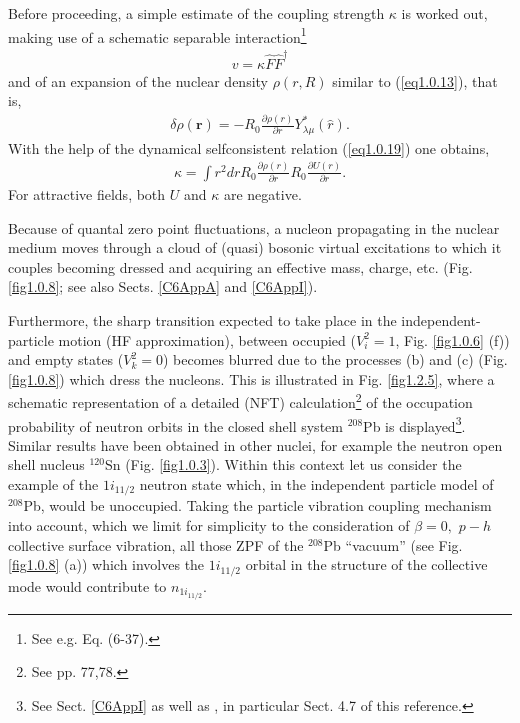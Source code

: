 Before proceeding, a simple estimate of the coupling strength $\kappa$ is worked out, making use of a schematic separable interaction\footnote{See e.g. \cite{Bohr:75} Eq. (6-37).}
\begin{align}\label{eq1.2.9}
v=\kappa\hat F\hat F^\dagger
\end{align}
and of an expansion of the nuclear density $\rho(r,R)$ similar to (\ref{eq1.0.13}), that is,
\begin{align}\label{eq1.2.10}
\delta\rho(\mathbf r)=-R_0\frac{\partial\rho(r)}{\partial r} Y^*_{\lambda\mu}(\hat r).
\end{align}
With the help of the dynamical selfconsistent relation  (\ref{eq1.0.19}) one obtains,
\begin{align}\label{eq1.2.11}
\kappa=\int r^2 dr R_0\frac{\partial\rho(r)}{\partial r}R_0\frac{\partial U(r)}{\partial r}.
\end{align}
For attractive fields, both $U$ and $\kappa$ are negative.



Because of quantal zero point fluctuations, a nucleon propagating in the nuclear medium moves through a cloud of (quasi) bosonic  virtual excitations to which it couples becoming dressed and acquiring  an effective mass, charge, etc. (Fig. \ref{fig1.0.8}; see also Sects. \ref{C6AppA} and \ref{C6AppI}). 




Furthermore, the sharp transition expected to take place in the independent-particle motion (HF approximation), between occupied ($V^2_i=1$, Fig. \ref{fig1.0.6} (f)) and empty states ($V^2_k=0$) becomes blurred due to the processes (b) and (c) (Fig. \ref{fig1.0.8}) which dress the nucleons. This is illustrated in Fig. \ref{fig1.2.5}, where a schematic representation of a detailed (NFT) calculation\footnote{See \cite{Bortignon:98} pp. 77,78.} of the occupation probability of neutron orbits in the closed shell system $^{208}$Pb is displayed\footnote{See Sect. \ref{C6AppI} as well as \cite{Mahaux:85}, in particular Sect. 4.7 of this reference.}. Similar results have been obtained in other nuclei, for example the neutron open shell nucleus $^{120}$Sn (Fig. \ref{fig1.0.3}). Within this context let us consider the example of the $1i_{11/2}$ neutron state which, in the independent particle model of $^{208}$Pb, would be unoccupied. Taking the particle vibration coupling mechanism into account, which we limit for simplicity to the consideration of $\beta=0,$ $p-h$ collective surface vibration, all those ZPF of the $^{208}$Pb ``vacuum'' (see Fig. \ref{fig1.0.8} (a)) which involves the $1i_{11/2}$ orbital in the structure of the collective mode would contribute to $n_{1i_{11/2}}$.

